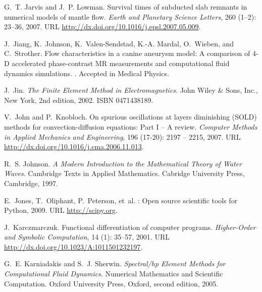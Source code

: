 \begin{thebibliography}{467}
G.~T. Jarvis and J.~P. Lowman.
\newblock Survival times of subducted slab remnants in numerical models of
  mantle flow.
\newblock \emph{Earth and Planetary Science Letters}, 260
  (1--2): 23--36, 2007.
\newblock URL \url{http://dx.doi.org/10.1016/j.epsl.2007.05.009}.

J.~Jiang, K.~Johnson, K.~Valen-Sendstad, K.-A. Mardal, O.~Wieben, and
  C.~Strother.
\newblock Flow characteristics in a canine aneurysm model: A comparison of
  {4-D} accelerated phase-contrast {MR} measurements and computational fluid
  dynamics simulations.
.
\newblock Accepted in Medical Physics.

J.~Jin.
\newblock \emph{The Finite Element Method in Electromagnetics}.
\newblock John Wiley \& Sons, Inc., New York, 2nd edition, 2002.
\newblock ISBN 0471438189.

V.~John and P.~Knobloch.
\newblock On spurious oscillations at layers diminishing ({SOLD}) methods for
  convection-diffusion equations: {P}art I -- {A} review.
\newblock \emph{Computer Methods in Applied Mechanics and Engineering},
  196 (17-20): 2197 -- 2215, 2007.
\newblock URL \url{http://dx.doi.org/10.1016/j.cma.2006.11.013}.

R.~S. Johnson.
\newblock \emph{A Modern Introduction to the Mathematical Theory of Water
  Waves}.
\newblock Cambridge Texts in Applied Mathematics. Cabridge University Press,
  Cambridge, 1997.

E.~Jones, T.~Oliphant, P.~Peterson, et~al.
: Open source scientific tools for {Python}, 2009.
\newblock URL \url{http://scipy.org}.

J.~Karczmarczuk.
\newblock Functional differentiation of computer programs.
\newblock \emph{Higher-Order and Symbolic Computation}, 14
  (1): 35--57, 2001.
\newblock URL \url{http://dx.doi.org/10.1023/A:1011501232197}.

G.~E. Karniadakis and S.~J. Sherwin.
\newblock \emph{Spectral/hp Element Methods for Computational Fluid Dynamics}.
\newblock Numerical Mathematics and Scientific Computation. Oxford University
  Press, Oxford, second edition, 2005.


\end{thebibliography}
